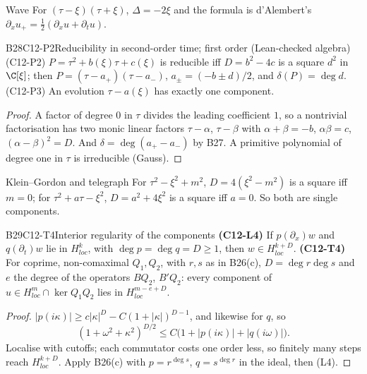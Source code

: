 \begin{example}{Wave}
For $(\tau-\xi)(\tau+\xi)$, $\Delta=-2\xi$ and the formula is d'Alembert's $\partial_xu_+=\tfrac12(\partial_xu+\partial_tu)$.
\end{example}

\begin{dimcard}{B28}{C12-P2}{Reducibility in second-order time; first order}{\proved{} (Lean-checked algebra)}{}
\label{dim:C12-P3}%
(C12-P2) $P=\tau^2+b(\xi)\tau+c(\xi)$ is reducible iff $D=b^2-4c$ is a square $d^2$ in $\C[\xi]$; then $P=(\tau-a_+)(\tau-a_-)$, $a_\pm=(-b\pm d)/2$, and $\delta(P)=\deg d$. (C12-P3) An evolution $\tau-a(\xi)$ has exactly one component.
\end{dimcard}
\begin{proof}
A factor of degree $0$ in $\tau$ divides the leading coefficient $1$, so a nontrivial factorisation has two monic linear factors $\tau-\alpha$, $\tau-\beta$ with $\alpha+\beta=-b$, $\alpha\beta=c$, $(\alpha-\beta)^2=D$. And $\delta=\deg(a_+-a_-)$ by B27.
A primitive polynomial of degree one in $\tau$ is irreducible (Gauss).
\end{proof}

\begin{example}{Klein--Gordon and telegraph}
For $\tau^2-\xi^2+m^2$, $D=4(\xi^2-m^2)$ is a square iff $m=0$; for $\tau^2+a\tau-\xi^2$, $D=a^2+4\xi^2$ is a square iff $a=0$. So both are single components.
\end{example}

\begin{dimcard}{B29}{C12-T4}{Interior regularity of the components}{\proved}{}
\label{dim:C12-L4}%
\textbf{(C12-L4)} If $p(\partial_x)w$ and $q(\partial_t)w$ lie in $H^k_{loc}$, with $\deg p=\deg q=D\ge1$, then $w\in H^{k+D}_{loc}$. \textbf{(C12-T4)} For coprime, non-comaximal $Q_1,Q_2$, with $r,s$ as in B26(c), $D=\deg r\deg s$ and $e$ the degree of the operators $BQ_2$, $B'Q_2$: every component of $u\in H^m_{loc}\cap\ker Q_1Q_2$ lies in $H^{m-e+D}_{loc}$.
\end{dimcard}
\begin{proof}
$|p(i\kappa)|\ge c|\kappa|^D-C(1+|\kappa|)^{D-1}$, and likewise for $q$, so
\[
(1+\omega^2+\kappa^2)^{D/2}\le C\big(1+|p(i\kappa)|+|q(i\omega)|\big).
\]
Localise with cutoffs; each commutator costs one order less, so finitely many steps reach $H^{k+D}_{loc}$.
Apply B26(c) with $p=r^{\deg s}$, $q=s^{\deg r}$ in the ideal, then (L4).
\end{proof}

